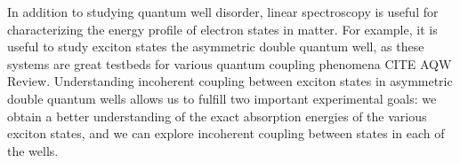 \indent In addition to studying quantum well disorder, linear spectroscopy is useful for characterizing the energy profile of electron states in matter. For example, it is useful to study exciton states the asymmetric double quantum well, as these systems are great testbeds for various quantum coupling phenomena CITE AQW Review. Understanding incoherent coupling between exciton states in asymmetric double quantum wells allows us to fulfill two important experimental goals: we obtain a better understanding of the exact absorption energies of the various exciton states, and we can explore incoherent coupling between states in each of the wells.







